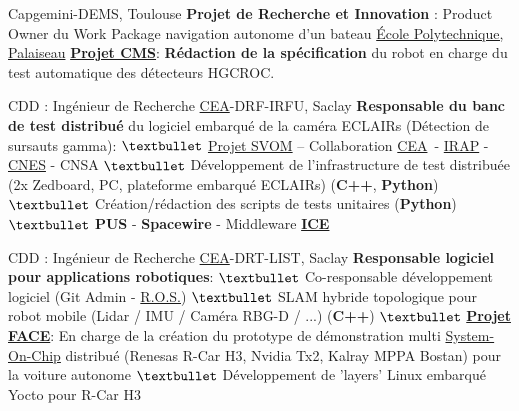 \documentclass[
	a4paper,
	maincolor=cvgreen,
	sectioncolor=cvgreen,
]{fortysecondscv}
\newcommand{\cea}{\href{http://www.cea.fr/}{CEA}}
\newcommand{\ros}{\href{http://www.ros.org/}{R.O.S.}}
\begin{document}
\begin{cvtable}[2]
  {Capgemini-DEMS, Toulouse}
  {
    \textbf{Projet de Recherche et Innovation} : Product Owner du Work Package
    navigation autonome d'un bateau
  }
  {\href{https://www.polytechnique.edu/fr/le-laboratoire-leprince-ringuet-llr}{École Polytechnique, Palaiseau}}
  {
    \textbf{\href{http://polywww.in2p3.fr/-cms-45-?lang=fr}{Projet CMS}}:
    \textbf{Rédaction de la spécification} du robot en charge du test
    automatique des détecteurs HGCROC.
  }
  
  {CDD : Ingénieur de Recherche}
  {\cea-DRF-IRFU, Saclay}
  {
    \textbf{Responsable du banc de test distribué} du logiciel embarqué de la
    caméra ECLAIRs (Détection de sursauts gamma):\newline
    $\textbullet$ \href{http://www.svom.fr/}{Projet SVOM} -- Collaboration \cea\
    - \href{http://www.irap.omp.eu/}{IRAP} - \href{https://cnes.fr/fr}{CNES} - CNSA\newline
    $\textbullet$ Développement de l'infrastructure de test distribuée (2x Zedboard, PC,
    plateforme embarqué ECLAIRs) (\textbf{C++}, \textbf{Python})\newline
    $\textbullet$ Création/rédaction des scripts de tests unitaires
    (\textbf{Python})\newline
    $\textbullet$ \textbf{PUS} - \textbf{Spacewire} - Middleware
    \href{https://zeroc.com/products/ice}{\textbf{ICE}}
  }
  
  {CDD : Ingénieur de Recherche}
  {\cea-DRT-LIST, Saclay}
  {
    \textbf{Responsable logiciel pour applications robotiques}:\newline
    $\textbullet$ Co-responsable développement logiciel (Git Admin - \ros)\newline
    $\textbullet$ SLAM hybride topologique pour robot mobile (Lidar / IMU / Caméra RBG-D
    / ...) (\textbf{C++})\newline
    $\textbullet$ \textbf{\href{https://www.designspot.fr/portfolio/face/}{Projet
        FACE}}: En charge de la création du prototype de démonstration multi
    \href{https://en.wikipedia.org/wiki/System_on_a_chip}{System-On-Chip}
    distribué (Renesas R-Car H3, Nvidia Tx2, Kalray MPPA Bostan) pour la voiture
    autonome\newline 
    $\textbullet$ Développement de 'layers' Linux embarqué Yocto pour R-Car H3
  }
  

\end{cvtable}
\end{document}
